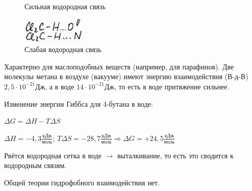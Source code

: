 \begin{lecture}
\begin{lecSection}
\begin{figure}[H]
\begin{minipage}[h]{0.2\linewidth}
		\caption{Сильная водородная связь}
	\end{minipage}
	\hfill
	\begin{minipage}[h]{0.2\linewidth}
		\centering\includegraphics[width=\linewidth]{lecture_07/pic4}
		\caption{Слабая водородная связь}
	\end{minipage}
	\hfill
	\end{figure}
	
	\end{lecSection}
	
	\begin{lecSection}
	\begin{flushleft}
	Характерно для маслоподобных веществ (например, для парафинов). Две молекулы метана в воздухе (вакууме) имеют энергию взаимодействия (В-д-В) $2,5 \cdot 10^{-21}\text{Дж}$, а в воде $14\cdot 10^{-21}\text{Дж}$, то есть в воде притяжение сильнее.
	\par Изменение энергии Гиббса для 4-бутана в воде:
	\par $\Delta G = \Delta H - T\Delta S$
	\par $\Delta H = -4,3\frac{\text{кДж}}{\text{моль}}$; $T\Delta S = -28,7\frac{\text{кДж}}{\text{моль}} \Rightarrow \Delta G = +24,5 \frac{\text{кДж}}{\text{моль}}$ 
	\par Рвётся водородная сетка в воде $\rightarrow$ выталкивание, то есть это сводится к водородным связям.
	\par Общей теории гидрофобного взаимодействия нет.
	\end{flushleft}
	\end{lecSection}
	

\end{lecture}
